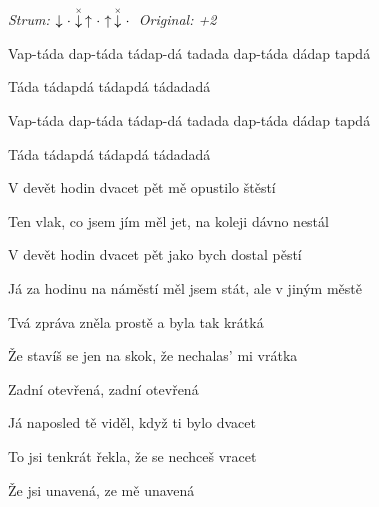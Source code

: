 \begin{song}


 \quad
\textit{Strum:} $\Down\Miss\ChuckDown\Up\Miss\Up\ChuckDown\Miss$  \quad
\textit{Original: +2}

\large


\large

\bigskip

\begin{chorusbox}{\Refren}
Vap-táda dap-táda tádap-dá tadada dap-táda dádap tapdá \par
Táda tádapdá tádapdá tádadadá  \par
{}Vap-táda dap-táda tádap-dá tadada dap-táda dádap tapdá \par
Táda tádapdá tádapdá tádadadá  \par
\end{chorusbox}

\bigskip

V devět hodin dvacet pět  mě opustilo štěstí \par
Ten vlak, co jsem jím měl jet, na koleji  dávno nestál \par
{}V devět hodin dvacet pět  jako bych dostal pěstí \par
Já za hodinu na náměstí měl jsem stát, ale v jiným městě

\bigskip

Tvá zpráva zněla prostě a byla tak krátká \par
Že stavíš se jen na skok, že nechalas' mi vrátka \par
{}Zadní otevřená, zadní otevřená

\bigskip

Já naposled tě viděl, když ti bylo dvacet \par
{}To jsi tenkrát řekla, že se nechceš vracet \par
{}Že jsi unavená, ze mě unavená \par

\bigskip

\Refren

\bigskip


\end{song}
